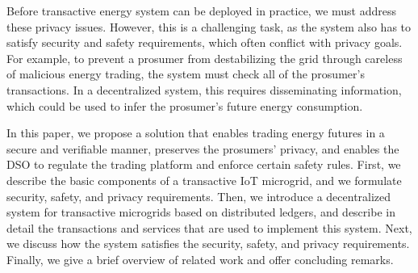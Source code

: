 Before transactive energy system can be deployed in practice, we must address these privacy issues.
However, this is a challenging task, as the system also has to satisfy security and safety requirements, which often conflict with privacy goals.
For example, to prevent a prosumer from destabilizing the grid through careless of malicious energy trading, the system must check all of the prosumer's transactions.
In a decentralized system, this requires disseminating information, which could be used to infer the prosumer's future energy consumption.

In this paper, we propose a solution that enables trading energy futures in a secure and verifiable manner, preserves the prosumers' privacy, and enables the DSO to regulate the trading platform and enforce certain safety rules.
First, we describe the basic components of a transactive IoT microgrid, and we formulate security, safety, and privacy requirements. 
Then, we introduce a decentralized system for transactive microgrids based on distributed ledgers, and describe in detail the transactions and services that are used to implement this system.
Next, we discuss how the system satisfies the security, safety, and privacy requirements.
Finally, we give a brief overview of related work and offer concluding remarks.

